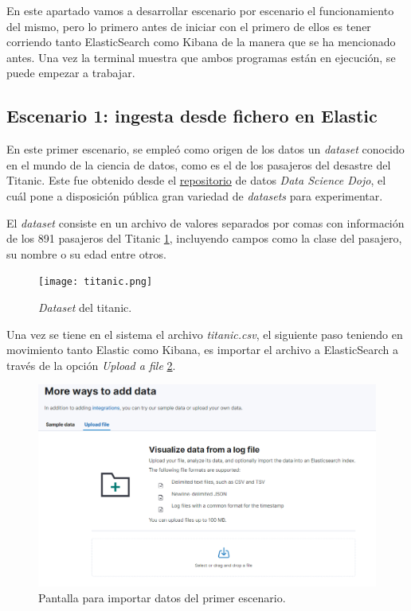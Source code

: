 En este apartado vamos a desarrollar escenario por escenario el funcionamiento del mismo, pero lo primero antes de iniciar con el primero de ellos es tener corriendo tanto ElasticSearch como Kibana de la manera que se ha mencionado antes. Una vez la terminal muestra que ambos programas están en ejecución, se puede empezar a trabajar.

\subsection{Escenario 1: ingesta desde fichero en Elastic}
En este primer escenario, se empleó como origen de los datos un \textit{dataset} conocido en el mundo de la ciencia de datos, como es el de los pasajeros del desastre del Titanic. Este fue obtenido desde el \href{https://github.com/datasciencedojo/datasets/blob/master/titanic.csv}{repositorio} de datos \textit{Data Science Dojo}, el cuál pone a disposición pública gran variedad de \textit{datasets} para experimentar.

El \textit{dataset} consiste en un archivo de valores separados por comas con información de los 891 pasajeros del Titanic \ref{fig:titanic}, incluyendo campos como la clase del pasajero, su nombre o su edad entre otros.

\begin{figure}
    \centering
    \texttt{[image: titanic.png]}
    \caption{\textit{Dataset} del titanic.}
    \label{fig:titanic}
\end{figure}

Una vez se tiene en el sistema el archivo \textit{titanic.csv}, el siguiente paso teniendo en movimiento tanto Elastic como Kibana, es importar el archivo a ElasticSearch a través de la opción \textit{Upload a file} \ref{fig:escenario11}.

\begin{figure}
    \centering
    \includegraphics[width=1\linewidth]{img/ingesta1.png}
    \caption{Pantalla para importar datos del primer escenario.}
    \label{fig:escenario11}
\end{figure}

